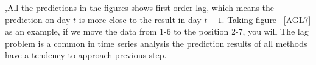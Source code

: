 

 



,All the predictions in the figures shows  first-order-lag, which means the prediction on  day $t$ is more close to the result in  day $t-1$.  Taking figure ~\ref{AGL7} as an example, if we move the  data from 1-6 to the position 2-7, you will  The lag problem is a common  in time series analysis  the prediction results of all methods have a tendency to approach  previous step.  




